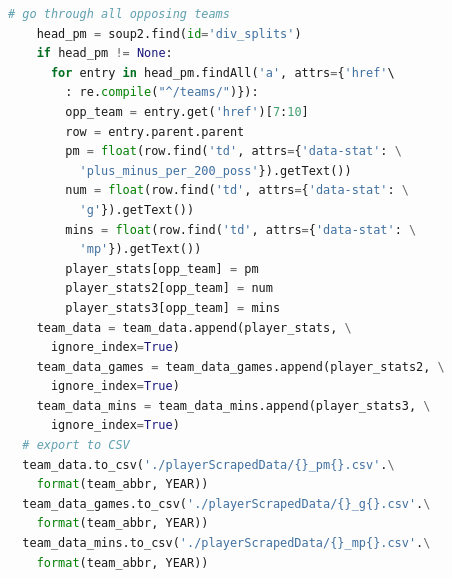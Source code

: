 \documentclass[12pt]{article}%
\begin{document}
\begin{lstlisting}[language=Python]
    # go through all opposing teams
    head_pm = soup2.find(id='div_splits')
    if head_pm != None:
      for entry in head_pm.findAll('a', attrs={'href'\
        : re.compile("^/teams/")}):
        opp_team = entry.get('href')[7:10]
        row = entry.parent.parent
        pm = float(row.find('td', attrs={'data-stat': \
          'plus_minus_per_200_poss'}).getText())
        num = float(row.find('td', attrs={'data-stat': \
          'g'}).getText())
        mins = float(row.find('td', attrs={'data-stat': \
          'mp'}).getText())
        player_stats[opp_team] = pm
        player_stats2[opp_team] = num
        player_stats3[opp_team] = mins
    team_data = team_data.append(player_stats, \
      ignore_index=True)
    team_data_games = team_data_games.append(player_stats2, \
      ignore_index=True)
    team_data_mins = team_data_mins.append(player_stats3, \
      ignore_index=True)
  # export to CSV
  team_data.to_csv('./playerScrapedData/{}_pm{}.csv'.\
    format(team_abbr, YEAR))
  team_data_games.to_csv('./playerScrapedData/{}_g{}.csv'.\
    format(team_abbr, YEAR))
  team_data_mins.to_csv('./playerScrapedData/{}_mp{}.csv'.\
    format(team_abbr, YEAR))


\end{lstlisting}
\end{document}
